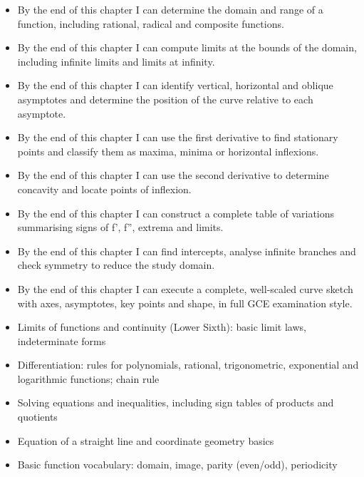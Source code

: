 \documentclass[11pt]{article}
\begin{document}
\begin{objectifs}
\begin{itemize}
\item By the end of this chapter I can determine the domain and range of a function, including rational, radical and composite functions.
\item By the end of this chapter I can compute limits at the bounds of the domain, including infinite limits and limits at infinity.
\item By the end of this chapter I can identify vertical, horizontal and oblique asymptotes and determine the position of the curve relative to each asymptote.
\item By the end of this chapter I can use the first derivative to find stationary points and classify them as maxima, minima or horizontal inflexions.
\item By the end of this chapter I can use the second derivative to determine concavity and locate points of inflexion.
\item By the end of this chapter I can construct a complete table of variations summarising signs of f', f'', extrema and limits.
\item By the end of this chapter I can find intercepts, analyse infinite branches and check symmetry to reduce the study domain.
\item By the end of this chapter I can execute a complete, well-scaled curve sketch with axes, asymptotes, key points and shape, in full GCE examination style.
\end{itemize}
\end{objectifs}

\begin{prerequis}
\begin{itemize}
\item Limits of functions and continuity (Lower Sixth): basic limit laws, indeterminate forms
\item Differentiation: rules for polynomials, rational, trigonometric, exponential and logarithmic functions; chain rule
\item Solving equations and inequalities, including sign tables of products and quotients
\item Equation of a straight line and coordinate geometry basics
\item Basic function vocabulary: domain, image, parity (even/odd), periodicity
\end{itemize}
\end{prerequis}
\end{document}
